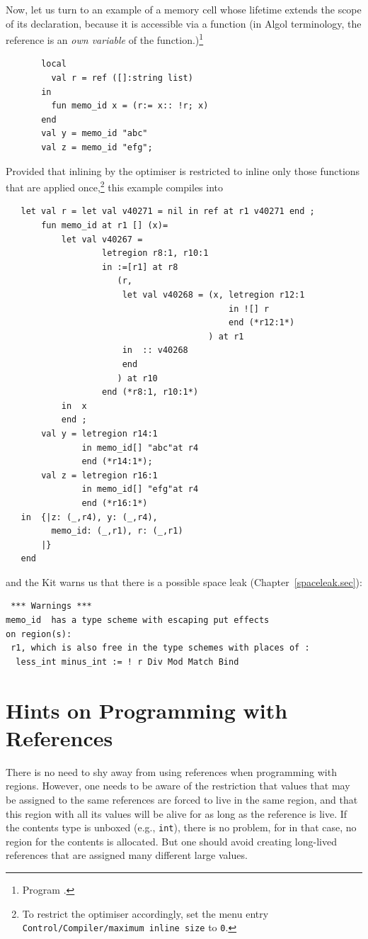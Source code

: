 \documentclass[12pt]{book}
\begin{document}
Now, let us turn to an example of a memory cell whose lifetime
extends the scope of its declaration, because it is
accessible via a function (in Algol terminology,
the reference is an {\em own variable} of the function.)\footnote{Program .}
\begin{verbatim}
       local
         val r = ref ([]:string list)
       in
         fun memo_id x = (r:= x:: !r; x)
       end
       val y = memo_id "abc"
       val z = memo_id "efg";
\end{verbatim}
Provided that inlining by the optimiser is restricted to inline only
those functions that are applied once,\footnote{To restrict the
  optimiser accordingly, set the menu entry {\tt Control/Compiler/maximum
    inline size} to {\tt 0}.} this example compiles into
\begin{verbatim}
   let val r = let val v40271 = nil in ref at r1 v40271 end ; 
       fun memo_id at r1 [] (x)= 
           let val v40267 = 
                   letregion r8:1, r10:1 
                   in :=[r1] at r8 
                      (r, 
                       let val v40268 = (x, letregion r12:1 
                                            in ![] r 
                                            end (*r12:1*)
                                        ) at r1
                       in  :: v40268
                       end 
                      ) at r10 
                   end (*r8:1, r10:1*)
           in  x
           end ; 
       val y = letregion r14:1 
               in memo_id[] "abc"at r4 
               end (*r14:1*); 
       val z = letregion r16:1 
               in memo_id[] "efg"at r4 
               end (*r16:1*)
   in  {|z: (_,r4), y: (_,r4), 
         memo_id: (_,r1), r: (_,r1)
       |}
   end 
\end{verbatim}
and the Kit warns us that there is a possible space leak (Chapter~\ref{spaceleak.sec}):
\begin{verbatim}
 *** Warnings ***
memo_id  has a type scheme with escaping put effects 
on region(s): 
 r1, which is also free in the type schemes with places of :  
  less_int minus_int := ! r Div Mod Match Bind
\end{verbatim}

\section{Hints on Programming  with References}
There is no need to shy away from using references when programming
with regions. However, one needs to be aware of the restriction that
values that may be assigned to the same references are forced to live
in the same region, and that this region with all its values will be alive
for as long as the reference is live. If the
contents type is unboxed (e.g., {\tt int}), there is no problem,
for in that case, no region
for the contents is allocated. But one should avoid creating
long-lived references that are assigned many different large values.
\end{document}
